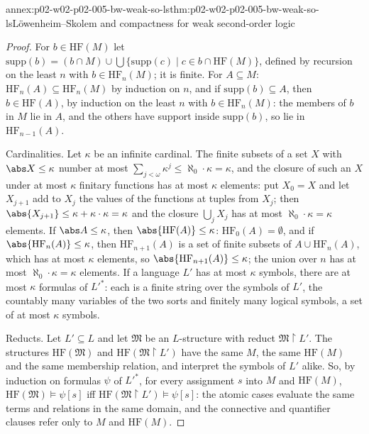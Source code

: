 \begin{annexitem}{annex:p02-w02-p02-005-bw-weak-so-ls}{thm:p02-w02-p02-005-bw-weak-so-ls}{L\"owenheim--Skolem and compactness for weak second-order logic}
\begin{proof}
For \(b\in\mathrm{HF}(M)\) let \(\mathrm{supp}(b)=(b\cap M)\cup
\bigcup\{\mathrm{supp}(c)\mid c\in b\cap\mathrm{HF}(M)\}\), defined by
recursion on the least \(n\) with \(b\in\mathrm{HF}_n(M)\); it is finite.
For \(A\subseteq M\): \(\mathrm{HF}_n(A)\subseteq\mathrm{HF}_n(M)\) by
induction on \(n\), and if \(\mathrm{supp}(b)\subseteq A\), then
\(b\in\mathrm{HF}(A)\), by induction on the least \(n\) with
\(b\in\mathrm{HF}_n(M)\): the members of \(b\) in \(M\) lie in \(A\), and
the others have support inside \(\mathrm{supp}(b)\), so lie in
\(\mathrm{HF}_{n-1}(A)\).

Cardinalities.  Let \(\kappa\) be an infinite cardinal.  The finite subsets
of a set \(X\) with \(\abs X\leq\kappa\) number at most
\(\sum_{j<\omega}\kappa^j\leq\aleph_0\cdot\kappa=\kappa\), and the closure
of such an \(X\) under at most \(\kappa\) finitary functions has at most
\(\kappa\) elements: put \(X_0=X\) and let \(X_{j+1}\) add to \(X_j\) the
values of the functions at tuples from \(X_j\); then
\(\abs{X_{j+1}}\leq\kappa+\kappa\cdot\kappa=\kappa\) and the closure
\(\bigcup_jX_j\) has at most \(\aleph_0\cdot\kappa=\kappa\) elements.  If
\(\abs A\leq\kappa\), then \(\abs{\mathrm{HF}(A)}\leq\kappa\):
\(\mathrm{HF}_0(A)=\emptyset\), and if \(\abs{\mathrm{HF}_n(A)}\leq\kappa\),
then \(\mathrm{HF}_{n+1}(A)\) is a set of finite subsets of
\(A\cup\mathrm{HF}_n(A)\), which has at most \(\kappa\) elements, so
\(\abs{\mathrm{HF}_{n+1}(A)}\leq\kappa\); the union over \(n\) has at most
\(\aleph_0\cdot\kappa=\kappa\) elements.  If a language \(L'\) has at most
\(\kappa\) symbols, there are at most \(\kappa\) formulas of \(L'^{*}\):
each is a finite string over the symbols of \(L'\), the countably many
variables of the two sorts and finitely many logical symbols, a set of at
most \(\kappa\) symbols.

Reducts.  Let \(L'\subseteq L\) and let \(\mathfrak M\) be an
\(L\)-structure with reduct \(\mathfrak M\restriction L'\).  The structures
\(\mathrm{HF}(\mathfrak M)\) and \(\mathrm{HF}(\mathfrak M\restriction L')\)
have the same \(M\), the same \(\mathrm{HF}(M)\) and the same membership
relation, and interpret the symbols of \(L'\) alike.  So, by induction on
formulas \(\psi\) of \(L'^{*}\), for every assignment \(s\) into \(M\) and
\(\mathrm{HF}(M)\), \(\mathrm{HF}(\mathfrak M)\models\psi[s]\) iff
\(\mathrm{HF}(\mathfrak M\restriction L')\models\psi[s]\): the atomic cases
evaluate the same terms and relations in the same domain, and the
connective and quantifier clauses refer only to \(M\) and \(\mathrm{HF}(M)\).


\end{proof}
\end{annexitem}
